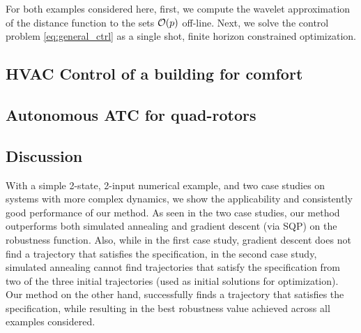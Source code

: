 For both examples considered here, first, we compute the wavelet approximation of the distance function to the sets $\mathcal{O}(p)$ off-line. Next, we solve the control problem \eqref{eq:general_ctrl} as a single shot, finite horizon constrained optimization. 


\subsection{HVAC Control of a building for comfort}



\subsection{Autonomous ATC for quad-rotors}


\subsection{Discussion}
With a simple 2-state, 2-input numerical example, and two case studies on systems with more complex dynamics, we show the applicability and consistently good performance of our method. As seen in the two case studies, our method outperforms both simulated annealing and gradient descent (via SQP) on the robustness function. Also, while in the first case study, gradient descent does not find a trajectory that satisfies the specification, in the second case study, simulated annealing cannot find trajectories that satisfy the specification from two of the three initial trajectories (used as initial solutions for optimization). Our method on the other hand, successfully finds a trajectory that satisfies the specification, while resulting in the best robustness value achieved across all examples considered. 

